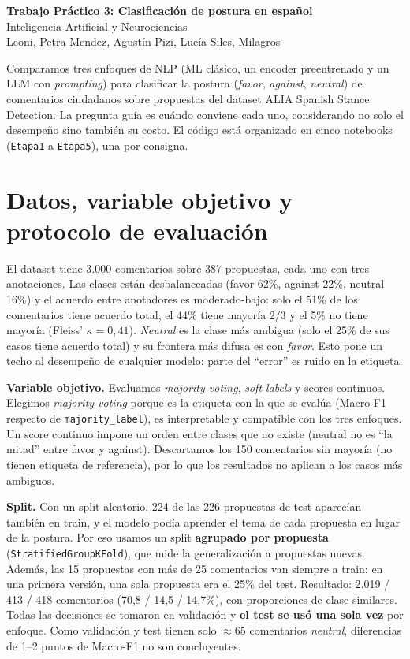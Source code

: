 \documentclass[10pt,a4paper]{article}
\newcommand{\cod}[1]{\texttt{\small #1}}
\begin{document}
\begin{center}
  {\Large\bfseries Trabajo Práctico 3: Clasificación de postura en español}\\[2pt]
  Inteligencia Artificial y Neurociencias\\[1pt]
  Leoni, Petra \textperiodcentered{} Mendez, Agustín \textperiodcentered{} Pizi, Lucía \textperiodcentered{} Siles, Milagros
\end{center}

Comparamos tres enfoques de NLP (ML clásico, un encoder preentrenado y un LLM con \emph{prompting}) para clasificar la postura (\emph{favor}, \emph{against}, \emph{neutral}) de comentarios ciudadanos sobre propuestas del dataset ALIA Spanish Stance Detection. La pregunta guía es cuándo conviene cada uno, considerando no solo el desempeño sino también su costo. El código está organizado en cinco notebooks (\cod{Etapa1} a \cod{Etapa5}), una por consigna.

\section{Datos, variable objetivo y protocolo de evaluación}

El dataset tiene 3.000 comentarios sobre 387 propuestas, cada uno con tres anotaciones. Las clases están desbalanceadas (favor 62\%, against 22\%, neutral 16\%) y el acuerdo entre anotadores es moderado-bajo: solo el 51\% de los comentarios tiene acuerdo total, el 44\% tiene mayoría 2/3 y el 5\% no tiene mayoría (Fleiss' $\kappa = 0{,}41$). \emph{Neutral} es la clase más ambigua (solo el 25\% de sus casos tiene acuerdo total) y su frontera más difusa es con \emph{favor}. Esto pone un techo al desempeño de cualquier modelo: parte del ``error'' es ruido en la etiqueta.

\textbf{Variable objetivo.} Evaluamos \emph{majority voting}, \emph{soft labels} y scores continuos. Elegimos \emph{majority voting} porque es la etiqueta con la que se evalúa (Macro-F1 respecto de \cod{majority\_label}), es interpretable y compatible con los tres enfoques. Un score continuo impone un orden entre clases que no existe (neutral no es ``la mitad'' entre favor y against). Descartamos los 150 comentarios sin mayoría (no tienen etiqueta de referencia), por lo que los resultados no aplican a los casos más ambiguos.

\textbf{Split.} Con un split aleatorio, 224 de las 226 propuestas de test aparecían también en train, y el modelo podía aprender el tema de cada propuesta en lugar de la postura. Por eso usamos un split \textbf{agrupado por propuesta} (\cod{StratifiedGroupKFold}), que mide la generalización a propuestas nuevas. Además, las 15 propuestas con más de 25 comentarios van siempre a train: en una primera versión, una sola propuesta era el 25\% del test. Resultado: 2.019 / 413 / 418 comentarios (70,8 / 14,5 / 14,7\%), con proporciones de clase similares. Todas las decisiones se tomaron en validación y \textbf{el test se usó una sola vez} por enfoque. Como validación y test tienen solo $\approx$65 comentarios \emph{neutral}, diferencias de 1--2 puntos de Macro-F1 no son concluyentes.
\end{document}
